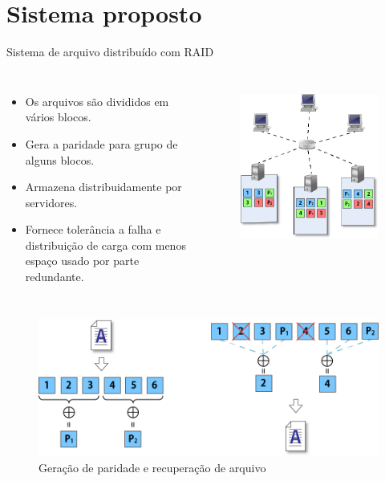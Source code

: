 \section{Sistema proposto}
\begin{frame}{Sistema de arquivo distribuído com RAID}
	
	\begin{columns}
		\begin{itemize}
			\item Os arquivos são divididos em vários blocos.
			\item Gera a paridade para grupo de alguns blocos.
			\item Armazena distribuidamente por servidores.
			\item Fornece tolerância a falha e distribuição de carga com menos espaço usado por parte redundante.
		\end{itemize}
		
		\begin{figure}
			\includegraphics[width=\textwidth]{imagens/image4}
			\label{fig:exemplo}
		\end{figure}
	\end{columns}
	
\end{frame}


\begin{frame}{}
	
	\begin{figure}
		\includegraphics[width=\textwidth]{imagens/image5}
		\caption{Geração de paridade e recuperação de arquivo}
		\label{fig:exemplo}
	\end{figure}
	
\end{frame}